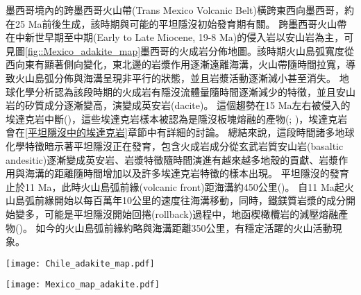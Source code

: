 墨西哥境內的跨墨西哥火山帶(Trans Mexico Volcanic Belt)橫跨東西向墨西哥，約在25 Ma前後生成，該時期與可能的平坦隱沒初始發育期有關。
跨墨西哥火山帶在中新世早期至中期(Early to Late Miocene, 19-8 Ma)的侵入岩以安山岩為主，可見圖\ref{fig::Mexico_adakite_map}墨西哥的火成岩分佈地圖。該時期火山島弧寬度從西向東有顯著側向變化，東北邊的岩漿作用逐漸遠離海溝，火山帶隨時間拉寬，導致火山島弧分佈與海溝呈現非平行的狀態，並且岩漿活動逐漸減小甚至消失。
地球化學分析認為該段時期的火成岩有隱沒流體量隨時間逐漸減少的特徵，並且安山岩的矽質成分逐漸變高，演變成英安岩(dacite)。
這個趨勢在15 Ma左右被侵入的埃達克岩中斷(\citealp{mori2007effects})，這些埃達克岩樣本被認為是隱沒板塊熔融的產物(\citealp{gomez2003temporal}; \citealp{mori2007effects})，埃達克岩會在\ref{平坦隱沒中的埃達克岩}章節中有詳細的討論。
總結來說，這段時間諸多地球化學特徵暗示著平坦隱沒正在發育，包含火成岩成分從玄武岩質安山岩(basaltic andesitic)逐漸變成英安岩、岩漿特徵隨時間演進有越來越多地殼的貢獻、岩漿作用與海溝的距離隨時間增加以及許多埃達克岩特徵的樣本出現。
平坦隱沒的發育止於11 Ma，此時火山島弧前緣(volcanic front)距海溝約450公里(\citealp{Manea2011Thermal})。
自11 Ma起火山島弧前緣開始以每百萬年10公里的速度往海溝移動，同時，鐵鎂質岩漿的成分開始變多，可能是平坦隱沒開始回捲(rollback)過程中，地函楔橄欖岩的減壓熔融產物(\citealp{gomez2003temporal})。
如今的火山島弧前緣約略與海溝距離350公里，有穩定活躍的火山活動現象。

\begin{figure*}[htp]
    \centering
    \texttt{[image: Chile\_adakite\_map.pdf]}
    \caption[智利火山分佈，摘自\citet{goss2009extreme}]{智利火山分佈，摘自\citet{goss2009extreme}。
    (a)南美洲西海岸和安第斯山脈主要構造形態特徵示意圖，改編自\citet{lamb2003cenozoic}。虛線為國界。黑色箭頭表示\citet{demets1990current}的平均聚合速度。板塊等深度線為灰色粗線，海拔高度2000公尺以上區域以橘色表示。三角形標示出活火山位置，NVZ = 北部火山區，CVZ = 中部火山區，SVZ = 南部火山區。黃色陰影框表示北部平坦隱沒區與過度區(27.5°–28.5°S)。
    (b)顯示圖(a)中黃色陰影框地圖。黑色實線為現代中部火山島弧位置，黑色短虛線為中新世火山島弧弧前位置。中生代火山島弧寬度由黑細線標出範圍。中生代火山島弧的侏羅紀 La Negra 玄武岩和輝長岩的露頭以灰色陰影顯示，新近紀玄武質火山活動地點由白星表示。黑色箭頭顯示約 50 公里的晚中新世火山島弧向東遷移。埃達克質火山活動區域由黃色圈圈表示，包括約 8 Ma Dos Hermanos lava、7-6 Ma與6-3 Ma的Pircas Negras和 3-2 Ma 的 Rio Salado Pircas Negras。
    }
    \label{fig::Chile_adakite_map}
\end{figure*}

\begin{figure*}[ht!]
    \centering
    \texttt{[image: Mexico\_map\_adakite.pdf]}
    \caption[中新世早期至晚期跨墨西哥火山帶火成岩分佈，摘自\citet{ferrari2012dynamic}]{中新世早期至晚期跨墨西哥火山帶火成岩分佈，摘自\citet{ferrari2012dynamic}。其中，黃色圈起處的火山為具有埃達克岩組成的火山。圓點表示\ref{平坦隱沒中的埃達克岩}節中圖\ref{fig::Cocos_geochemisty}進行地球化學分析的樣本位置，星星表示進行定年分析的樣本位置。紅圈圈處的Chalcalzingo domes為20 Ma前後出現的流紋岩樣本，具有非常高矽質埃達克岩成份，被視為該區最早的火成岩樣本，並且其成份為幾乎無雜質的隱沒板塊熔融物質(\citealp{gomez2008origin})。
    }
    \label{fig::Mexico_adakite_map}
\end{figure*}